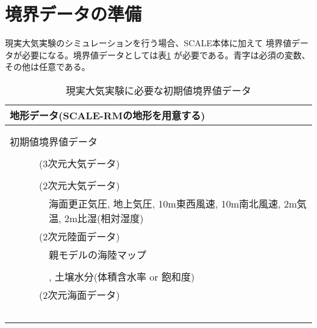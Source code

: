 \section{境界データの準備}

現実大気実験のシミュレーションを行う場合、SCALE本体に加えて
境界値データが必要になる。境界値データとしては表\ref{tab:real_bnd}
が必要である。{\color{blue}青字}は必須の変数、その他は任意である。

\begin{table}[h]
\begin{center}
  \caption{現実大気実験に必要な初期値境界値データ}
  \label{tab:real_bnd}
  \begin{tabularx}{150mm}{llX} \hline
    \multicolumn{3}{l}{地形データ(SCALE-RMの地形を用意する)}\\ \hline
    & \multicolumn{2}{l}{\color{blue}{標高データ}}\\
    & \multicolumn{2}{l}{\color{blue}{土地利用データ}}\\ \hline
    \multicolumn{3}{l}{初期値境界値データ}\\ \hline
    &  \multicolumn{2}{l}{\color{blue}{親モデルの緯度・経度}}\\
    &  \multicolumn{2}{l}{(3次元大気データ)}\\
    & &  \multicolumn{1}{l}{\color{blue}{東西風速, 南北風速, 気温, 比湿(相対湿度), 気圧, ジオポテンシャル高度}} \\
    &  \multicolumn{2}{l}{(2次元大気データ)}\\
    & & 海面更正気圧, 地上気圧, 10m東西風速, 10m南北風速, 2m気温, 2m比湿(相対湿度) \\
    &  \multicolumn{2}{l}{(2次元陸面データ)}\\
    & &  \multicolumn{1}{l}{親モデルの海陸マップ}\\
    & &  \multicolumn{1}{l}{\color{blue}{地表面温度(Skin temp)}}\\
    & &  \multicolumn{1}{l}{{\color{blue}{親モデル土壌データの深さ情報, 土壌温度}}, 土壌水分(体積含水率 or 飽和度)}\\
    &  \multicolumn{2}{l}{(2次元海面データ)}\\
　　& &  \multicolumn{1}{l}{\color{blue}{海面水温(Skin tempがある場合は省略可)}}\\ \hline
  \end{tabularx}
\end{center}
\end{table}


